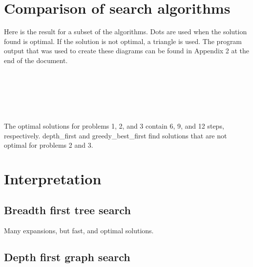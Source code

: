 \documentclass[11pt]{scrartcl}
\begin{document}
    
\section*{Comparison of search algorithms}\label{comparison-of-search-algorithms}

Here is the result for a subset of the algorithms. Dots are used when
the solution found is optimal. If the solution is not optimal, a
triangle is used. The program output that was used to create these
diagrams can be found in Appendix 2 at the end of the document.

    \begin{center}
    \end{center}
    { \hspace*{\fill} \\}
    
    \begin{center}
    \end{center}
    { \hspace*{\fill} \\}
    
    \begin{center}
    \end{center}
    { \hspace*{\fill} \\}
    
    The optimal solutions for problems 1, 2, and 3 contain 6, 9, and 12
steps, respectively. depth\_first and greedy\_best\_first find solutions
that are not optimal for problems 2 and 3.

\section*{Interpretation}\label{interpretation}

\subsection*{Breadth first tree search}\label{breadth-first-tree-search}

Many expansions, but fast, and optimal solutions.

\subsection*{Depth first graph search}\label{depth-first-graph-search}
\end{document}
